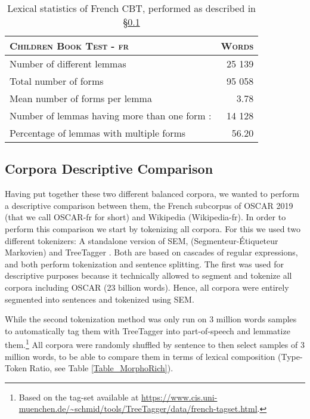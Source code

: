 \begin{table}[ht]
    \centering\small
    \begin{tabular}{lr}                                                             \\\toprule
        {\textsc{Children Book Test - fr}}           & { \textsc{Words}} \\\midrule
        Number of different lemmas                   & 25 139            \\
        Total number of forms                        & 95 058            \\
        Mean number of forms per lemma               & 3.78              \\
        Number of lemmas having more than one form : & 14 128            \\
        Percentage of lemmas with multiple forms     & 56.20             \\
        \bottomrule
    \end{tabular}
    \caption{\label{Table_DescribeCBTfr} Lexical statistics of French CBT, performed as described in §\ref{sec:CompareCorpora}}
\end{table}

\subsection{Corpora Descriptive Comparison} \label{sec:CompareCorpora}

Having put together these two different balanced corpora, we wanted to perform a descriptive comparison between them, the French subcorpus of OSCAR 2019 (that we call OSCAR-fr for short) and Wikipedia (Wikipedia-fr). In order to perform this comparison we start by tokenizing all corpora. For this we used two different tokenizers: A standalone version of SEM, (Segmenteur-Étiqueteur Markovien) \citep{dupont-2017-exploration} and TreeTagger \citep{schmid-1999-improvements}. Both are based on cascades of regular expressions, and both perform tokenization and sentence splitting. The first was used for descriptive purposes because it technically allowed to segment and tokenize all corpora including OSCAR (23 billion words). Hence, all corpora were entirely segmented into sentences and tokenized using SEM.

While the second tokenization method was only run on 3 million words samples to automatically tag them with TreeTagger into part-of-speech and lemmatize them.\footnote{Based on the tag-set available at \url{https://www.cis.uni-muenchen.de/~schmid/tools/TreeTagger/data/french-tagset.html}.} All corpora were randomly shuffled by sentence to then select samples of 3 million words, to be able to compare them in terms of lexical composition (Type-Token Ratio, see Table \ref{Table_MorphoRich}).

